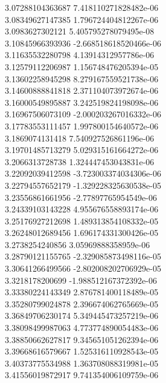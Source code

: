 {3.07288104363687 7.418110271828482e-06
 \\
3.08349627147385 1.796724404812267e-06
 \\
3.0983627302121 5.405795278079495e-08
 \\
3.10845966393936 -2.668518618520466e-06
 \\
3.11635532280798 4.13914312957786e-06
 \\
3.12579112206987 1.156748476205394e-05
 \\
3.13602258945298 8.279167559521738e-06
 \\
3.14600888841818 2.371104073972674e-06
 \\
3.16000549895887 3.242519824198098e-06
 \\
3.16967506073109 -2.000203267016332e-06
 \\
3.17783553111457 1.997800154640572e-06
 \\
3.1869074131418 7.540927526861196e-06
 \\
3.19701485713279 5.029315161664272e-06
 \\
3.2066313728738 1.324447453043831e-06
 \\
3.22092039412598 -3.723003374034306e-06
 \\
3.22794557652179 -1.329228325630538e-05
 \\
3.23556861661956 -2.77897765954549e-06
 \\
3.24339103143228 4.955676558893174e-06
 \\
3.25176927212698 1.489313854108332e-05
 \\
3.26248012689456 1.696174331300426e-05
 \\
3.2738254240856 3.05969888358959e-06
 \\
3.28790121155765 -2.329085873498116e-05
 \\
3.30641266499566 -2.802008202706929e-05
 \\
3.3218178200699 -1.988512167372392e-06
 \\
3.33380224143349 2.876781400118489e-05
 \\
3.35280799024878 2.396674062765669e-05
 \\
3.36849706230174 5.349445473257219e-06
 \\
3.38098499987063 4.773774890054483e-06
 \\
3.38850662627817 9.345651051262394e-06
 \\
3.39668616579667 1.525316110928543e-05
 \\
3.40373775534988 1.363708088319981e-05
 \\
3.41556019872917 9.741354006109759e-06
}
